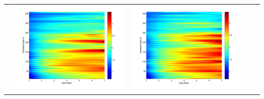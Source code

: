 \documentclass[11pt]{article}
\begin{document}
\begin{table}[H]
{\begin{tabular}{ccccc}
&\begin{minipage}{.3\textwidth}\includegraphics[width=\linewidth]{resultgraph/11532500pep.png}\end{minipage}
&\begin{minipage}{.3\textwidth}\includegraphics[width=\linewidth]{resultgraph/11532500pepq.png}\end{minipage}
\\
&

\end{tabular}}
\end{table}
\end{document}
